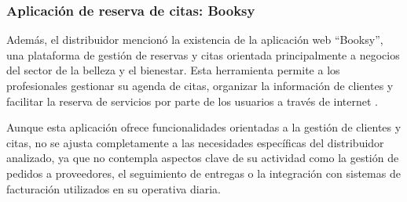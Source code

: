 \subsubsection{Aplicación de reserva de citas: Booksy}

Además, el distribuidor mencionó la existencia de la aplicación web ``Booksy'', una plataforma de gestión de reservas y citas orientada principalmente a negocios del sector de la belleza y el bienestar. Esta herramienta permite a los profesionales gestionar su agenda de citas, organizar la información de clientes y facilitar la reserva de servicios por parte de los usuarios a través de internet \cite{booksy}. 

Aunque esta aplicación ofrece funcionalidades orientadas a la gestión de clientes y citas, no se ajusta completamente a las necesidades específicas del distribuidor analizado, ya que no contempla aspectos clave de su actividad como la gestión de pedidos a proveedores, el seguimiento de entregas o la integración con sistemas de facturación utilizados en su operativa diaria.